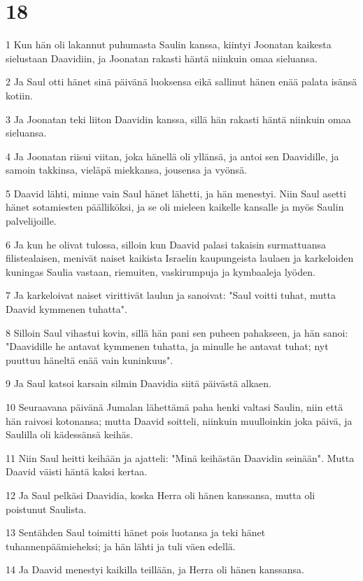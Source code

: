 \chapter{18}

\par 1 Kun hän oli lakannut puhumasta Saulin kanssa, kiintyi Joonatan kaikesta sielustaan Daavidiin, ja Joonatan rakasti häntä niinkuin omaa sieluansa.
\par 2 Ja Saul otti hänet sinä päivänä luoksensa eikä sallinut hänen enää palata isänsä kotiin.
\par 3 Ja Joonatan teki liiton Daavidin kanssa, sillä hän rakasti häntä niinkuin omaa sieluansa.
\par 4 Ja Joonatan riisui viitan, joka hänellä oli yllänsä, ja antoi sen Daavidille, ja samoin takkinsa, vieläpä miekkansa, jousensa ja vyönsä.
\par 5 Daavid lähti, minne vain Saul hänet lähetti, ja hän menestyi. Niin Saul asetti hänet sotamiesten päälliköksi, ja se oli mieleen kaikelle kansalle ja myös Saulin palvelijoille.
\par 6 Ja kun he olivat tulossa, silloin kun Daavid palasi takaisin surmattuansa filistealaisen, menivät naiset kaikista Israelin kaupungeista laulaen ja karkeloiden kuningas Saulia vastaan, riemuiten, vaskirumpuja ja kymbaaleja lyöden.
\par 7 Ja karkeloivat naiset virittivät laulun ja sanoivat: "Saul voitti tuhat, mutta Daavid kymmenen tuhatta".
\par 8 Silloin Saul vihastui kovin, sillä hän pani sen puheen pahakseen, ja hän sanoi: "Daavidille he antavat kymmenen tuhatta, ja minulle he antavat tuhat; nyt puuttuu häneltä enää vain kuninkuus".
\par 9 Ja Saul katsoi karsain silmin Daavidia siitä päivästä alkaen.
\par 10 Seuraavana päivänä Jumalan lähettämä paha henki valtasi Saulin, niin että hän raivosi kotonansa; mutta Daavid soitteli, niinkuin muulloinkin joka päivä, ja Saulilla oli kädessänsä keihäs.
\par 11 Niin Saul heitti keihään ja ajatteli: "Minä keihästän Daavidin seinään". Mutta Daavid väisti häntä kaksi kertaa.
\par 12 Ja Saul pelkäsi Daavidia, koska Herra oli hänen kanssansa, mutta oli poistunut Saulista.
\par 13 Sentähden Saul toimitti hänet pois luotansa ja teki hänet tuhannenpäämieheksi; ja hän lähti ja tuli väen edellä.
\par 14 Ja Daavid menestyi kaikilla teillään, ja Herra oli hänen kanssansa.
